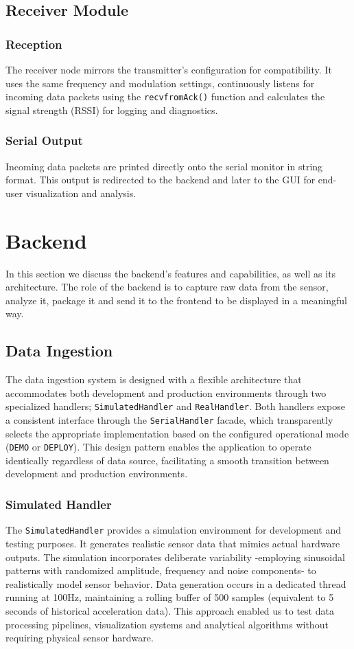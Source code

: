 \documentclass{article}
\begin{document}
\subsection{Receiver Module}
    \subsubsection{Reception}
    The receiver node mirrors the transmitter's configuration for compatibility. It uses the same frequency and modulation settings, continuously listens for incoming data packets using the \texttt{recvfromAck()} function and calculates the signal strength (RSSI) for logging and diagnostics.
    
    \subsubsection{Serial Output}
    Incoming data packets are printed directly onto the serial monitor in string format. This output is redirected to the backend and later to the GUI for end-user visualization and analysis.

\newpage
\section{Backend}
In this section we discuss the backend's features and capabilities, as well as its architecture. The role of the backend is to capture raw data from the sensor, analyze it, package it and send it to the frontend to be displayed in a meaningful way.

\subsection{Data Ingestion}
The data ingestion system is designed with a flexible architecture that accommodates both development and production environments through two specialized handlers; \texttt{SimulatedHandler} and \texttt{RealHandler}. Both handlers expose a consistent interface through the \texttt{SerialHandler} facade, which transparently selects the appropriate implementation based on the configured operational mode (\texttt{DEMO} or \texttt{DEPLOY}). This design pattern enables the application to operate identically regardless of data source, facilitating a smooth transition between development and production environments.
    \subsubsection{Simulated Handler}
    The \texttt{SimulatedHandler} provides a simulation environment for development and testing purposes. It generates realistic sensor data that mimics actual hardware outputs. The simulation incorporates deliberate variability -employing sinusoidal patterns with randomized amplitude, frequency and noise components- to realistically model sensor behavior. Data generation occurs in a dedicated thread running at 100Hz, maintaining a rolling buffer of 500 samples (equivalent to 5 seconds of historical acceleration data). This approach enabled us to test data processing pipelines, visualization systems and analytical algorithms without requiring physical sensor hardware.
    
\end{document}
